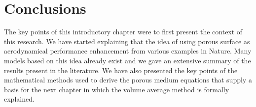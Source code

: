 \section{Conclusions}
The key points of this introductory chapter were to first present the context of this research. We have started explaining that the idea of using porous surface as aerodynamical performance enhancement from various examples in Nature.
Many models based on this idea already exist and we gave an extensive summary of the results present in the literature. We have also presented the key points of the mathematical methods used to derive the porous medium equations that supply a basis for the next chapter in which the volume average method is formally explained.
